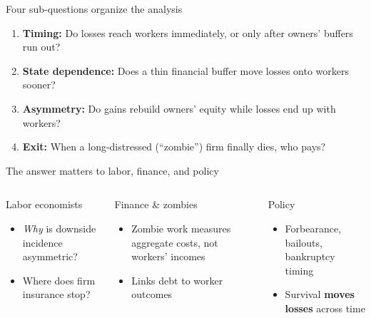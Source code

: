 \documentclass[aspectratio=169,11pt]{beamer}
\newlength{\safezone}
\newcommand{\hl}[1]{{\color{WarmAmber}\bfseries #1}}
\begin{document}
\begin{frame}[label=subq]{Four sub-questions organize the analysis}
  \begin{enumerate}
    \item \textbf{Timing:} Do losses reach workers immediately, or only after owners' buffers run out?
    \item \textbf{State dependence:} Does a thin financial buffer move losses onto workers sooner?
    \item \textbf{Asymmetry:} Do gains rebuild owners' equity while losses end up with workers?
    \item \textbf{Exit:} When a long-distressed (``zombie'') firm finally dies, who pays?
  \end{enumerate}
  \vfill
  \hfill\hyperlink{question}{}\hspace{\safezone}
\end{frame}

\begin{frame}[label=whocares]{The answer matters to labor, finance, and policy}
  \begin{columns}[T,onlytextwidth]
    \begin{cardbox}{Labor economists}
      \begin{itemize}
        \item \emph{Why} is downside incidence asymmetric?
        \item Where does firm insurance stop?
      \end{itemize}
    \end{cardbox}

    \begin{cardbox}{Finance \& zombies}
      \begin{itemize}
        \item Zombie work measures aggregate costs, not workers' incomes
        \item Links debt to worker outcomes
      \end{itemize}
    \end{cardbox}

    \begin{cardbox}{Policy}
      \begin{itemize}
        \item Forbearance, bailouts, bankruptcy timing
        \item Survival \hl{moves losses} across time
      \end{itemize}
    \end{cardbox}
  \end{columns}
  \vfill
  \hfill\hyperlink{question}{}\hspace{\safezone}
\end{frame}
\end{document}
